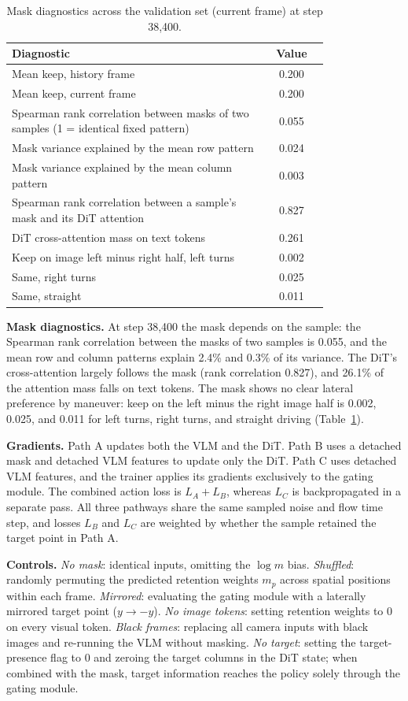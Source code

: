 \begin{table}
\centering\scriptsize
\caption{Mask diagnostics across the validation set (current frame) at step 38{,}400.}
\label{tab:app_diag}
\begin{tabular}{@{}p{0.8\linewidth}c@{}}
\toprule
Diagnostic & Value \\
\midrule
Mean keep, history frame & 0.200 \\
Mean keep, current frame & 0.200 \\
Spearman rank correlation between masks of two samples (1 = identical fixed pattern) & 0.055 \\
Mask variance explained by the mean row pattern & 0.024 \\
Mask variance explained by the mean column pattern & 0.003 \\
Spearman rank correlation between a sample's mask and its DiT attention & 0.827 \\
DiT cross-attention mass on text tokens & 0.261 \\
Keep on image left minus right half, left turns & 0.002 \\
Same, right turns & 0.025 \\
Same, straight & 0.011 \\
\bottomrule
\end{tabular}
\end{table}
\textbf{Mask diagnostics.} At step 38{,}400 the mask depends on the sample: the Spearman rank correlation between the masks of two samples is 0.055, and the mean row and column patterns explain 2.4\% and 0.3\% of its variance. The DiT's cross-attention largely follows the mask (rank correlation 0.827), and 26.1\% of the attention mass falls on text tokens. The mask shows no clear lateral preference by maneuver: keep on the left minus the right image half is 0.002, 0.025, and 0.011 for left turns, right turns, and straight driving (Table~\ref{tab:app_diag}).

\textbf{Gradients.} Path A updates both the VLM and the DiT. Path B uses a detached mask and detached VLM features to update only the DiT. Path C uses detached VLM features, and the trainer applies its gradients exclusively to the gating module. The combined action loss is $L_A+L_B$, whereas $L_C$ is backpropagated in a separate pass. All three pathways share the same sampled noise and flow time step, and losses $L_B$ and $L_C$ are weighted by whether the sample retained the target point in Path A.

\textbf{Controls.} \emph{No mask}: identical inputs, omitting the $\log m$ bias. \emph{Shuffled}: randomly permuting the predicted retention weights $m_p$ across spatial positions within each frame. \emph{Mirrored}: evaluating the gating module with a laterally mirrored target point ($y\to-y$). \emph{No image tokens}: setting retention weights to $0$ on every visual token. \emph{Black frames}: replacing all camera inputs with black images and re-running the VLM without masking. \emph{No target}: setting the target-presence flag to $0$ and zeroing the target columns in the DiT state; when combined with the mask, target information reaches the policy solely through the gating module.

